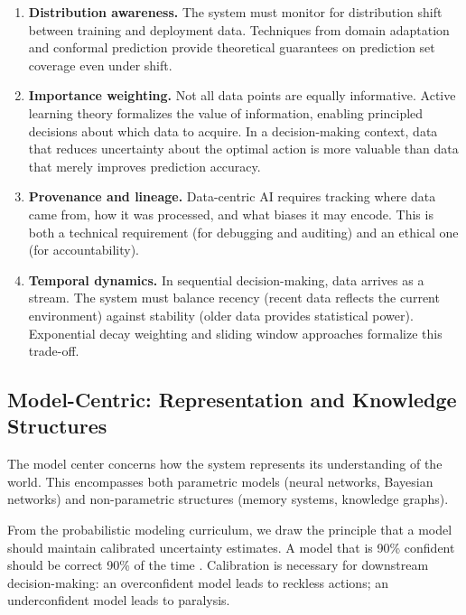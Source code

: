 \documentclass[11pt,a4paper]{article}
\begin{document}
\begin{enumerate}[leftmargin=*, itemsep=2pt]
  \item \textbf{Distribution awareness.} The system must monitor for distribution shift between training and deployment data. Techniques from domain adaptation and conformal prediction \citep{vovk2005algorithmic} provide theoretical guarantees on prediction set coverage even under shift.

  \item \textbf{Importance weighting.} Not all data points are equally informative. Active learning theory \citep{settles2012active} formalizes the value of information, enabling principled decisions about which data to acquire. In a decision-making context, data that reduces uncertainty about the optimal action is more valuable than data that merely improves prediction accuracy.

  \item \textbf{Provenance and lineage.} Data-centric AI requires tracking where data came from, how it was processed, and what biases it may encode. This is both a technical requirement (for debugging and auditing) and an ethical one (for accountability).

  \item \textbf{Temporal dynamics.} In sequential decision-making, data arrives as a stream. The system must balance recency (recent data reflects the current environment) against stability (older data provides statistical power). Exponential decay weighting and sliding window approaches formalize this trade-off.
\end{enumerate}

\subsection{Model-Centric: Representation and Knowledge Structures}

The model center concerns how the system represents its understanding of the world. This encompasses both parametric models (neural networks, Bayesian networks) and non-parametric structures (memory systems, knowledge graphs).

From the probabilistic modeling curriculum, we draw the principle that a model should maintain calibrated uncertainty estimates. A model that is 90\% confident should be correct 90\% of the time \citep{guo2017calibration}. Calibration is necessary for downstream decision-making: an overconfident model leads to reckless actions; an underconfident model leads to paralysis.
\end{document}
